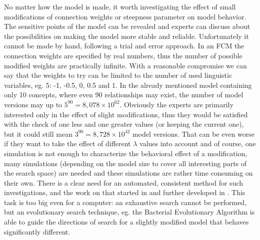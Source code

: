 \documentclass[graybox]{svmult}
\begin{document}
No matter how the model is made, it worth investigating the effect 
of small modifications of connection weights or steepness parameter 
on model behavior. The sensitive points of the model can be revealed 
and experts can discuss about the possibilities on making the model 
more stable and reliable. Unfortunately it cannot be made by hand, 
following a trial and error approach. In an FCM the connection 
weights are specified by real numbers, thus the number of possible 
modified weights are practically infinite. With a reasonable 
compromise we can say that the weights to try can be limited to the 
number of used linguistic variables, eg. 5: -1, -0.5, 0, 0.5 and 1. 
In the already mentioned model containing only 10 concepts, where 
even 90 relationships may exist, the number of model versions may up 
to $5^{90} = 8,078\times10^{62}$. Obviously the experts are primarily 
interested only in the effect of slight modifications, thus they 
would be satisfied with the check of one less and one greater values 
(or keeping the current one), but it could still mean $3^{90} = 
8,728\times10^{42}$ model versions. That can be even worse if they 
want to take the effect of different $\lambda$ values into account and 
of course, one simulation is not enough to characterize the behavioral 
effect of a modification, many simulations (depending on the model 
size to cover all interesting parts of the search space) are needed 
and these simulations are rather time consuming on their own. There is 
a clear need for an automated, consistent method for such 
investigations, and the work on that started in 
\cite{hatwagner2016uncertainty,hatwagner2017behavioral} and further 
developed in \cite{hatwagner2019banking,hatwagner2018improved}. This 
task is too big even for a computer: an exhaustive search cannot be 
performed, but an evolutionary search technique, eg. the Bacterial 
Evolutionary Algorithm is able to guide the directions of search for a 
slightly modified model that behaves significantly different.


\end{document}
